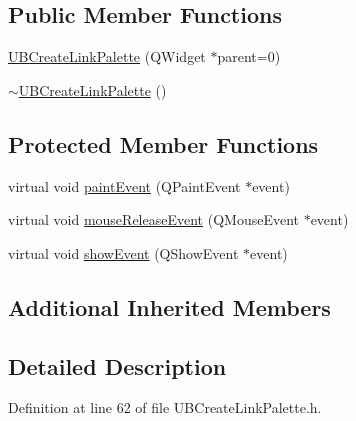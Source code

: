 \subsection*{Public Member Functions}
\begin{DoxyCompactItemize}
\item 
\hyperlink{class_u_b_create_link_palette_a1187c7015d0889e5f274fea870b393e9}{U\-B\-Create\-Link\-Palette} (Q\-Widget $\ast$parent=0)
\item 
\hyperlink{class_u_b_create_link_palette_a84a9a0d8e0d6817b2b3f24797c48c925}{$\sim$\-U\-B\-Create\-Link\-Palette} ()
\end{DoxyCompactItemize}
\subsection*{Protected Member Functions}
\begin{DoxyCompactItemize}
\item 
virtual void \hyperlink{class_u_b_create_link_palette_aa9068ea053c50338107c3ee65d9bba53}{paint\-Event} (Q\-Paint\-Event $\ast$event)
\item 
virtual void \hyperlink{class_u_b_create_link_palette_aebd7160b8ab9afc579ad20053a18fd2f}{mouse\-Release\-Event} (Q\-Mouse\-Event $\ast$event)
\item 
virtual void \hyperlink{class_u_b_create_link_palette_a84493dda08b44ff851c683df649acbf1}{show\-Event} (Q\-Show\-Event $\ast$event)
\end{DoxyCompactItemize}
\subsection*{Additional Inherited Members}


\subsection{Detailed Description}


Definition at line 62 of file U\-B\-Create\-Link\-Palette.\-h.




